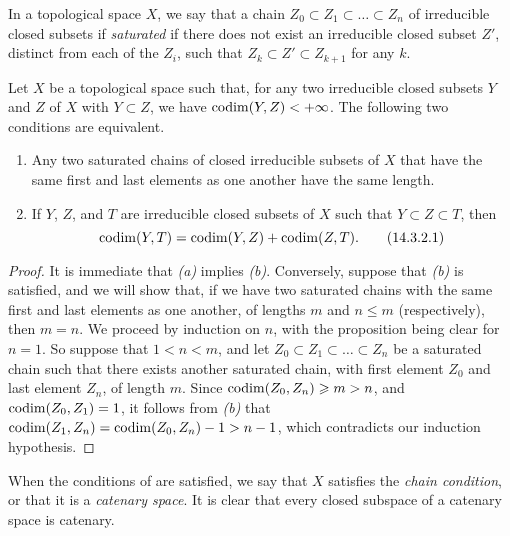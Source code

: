 \begin{env}[14.3.1]
\label{0.14.3.1}
In a topological space $X$, we say that a chain $Z_0\subset Z_1\subset\ldots\subset Z_n$ of irreducible closed subsets if \emph{saturated} if there does not exist an irreducible closed subset $Z'$, distinct from each of the $Z_i$, such that $Z_k\subset Z'\subset Z_{k+1}$ for any $k$.
\end{env}

\begin{prop}[14.3.2]
\label{0.14.3.2}
Let $X$ be a topological space such that, for any two irreducible closed subsets $Y$ and $Z$ of $X$ with $Y\subset Z$, we have ${\mathop{\mathrm{codim}}\nolimits}(Y,Z)<+\infty$.
The following two conditions are equivalent.
\begin{enumerate}[label=\emph{(\alph*)}]
    \item Any two saturated chains of closed irreducible subsets of $X$ that have the same first and last elements as one another have the same length.
    \item If $Y$, $Z$, and $T$ are irreducible closed subsets of $X$ such that $Y\subset Z\subset T$, then
        \begin{equation*}
        \label{0.14.3.2.1}
            {\mathop{\mathrm{codim}}\nolimits}(Y,T) = {\mathop{\mathrm{codim}}\nolimits}(Y,Z)+{\mathop{\mathrm{codim}}\nolimits}(Z,T).\tag{14.3.2.1}
        \end{equation*}
\end{enumerate}
\end{prop}

\begin{proof}
\label{proof-0.14.3.2}
It is immediate that \emph{(a)} implies \emph{(b)}.
Conversely, suppose that \emph{(b)} is satisfied, and we will show that, if we have two saturated chains with the same first and last elements as one another, of lengths $m$ and $n\leq m$ (respectively), then $m=n$.
We proceed by induction on $n$, with the proposition being clear for $n=1$.
So suppose that $1<n<m$, and let $Z_0\subset Z_1\subset\ldots\subset Z_n$ be a
saturated chain such that there exists another saturated chain, with first element $Z_0$ and last element $Z_n$, of length $m$.
Since ${\mathop{\mathrm{codim}}\nolimits}(Z_0,Z_n)\geqslant m>n$, and ${\mathop{\mathrm{codim}}\nolimits}(Z_0,Z_1)=1$, it follows from \emph{(b)} that ${\mathop{\mathrm{codim}}\nolimits}(Z_1,Z_n)={\mathop{\mathrm{codim}}\nolimits}(Z_0,Z_n)-1>n-1$, which contradicts our induction hypothesis.
\end{proof}

When the conditions of  are satisfied, we say that $X$ satisfies the \emph{chain condition}, or that it is a \emph{catenary space}.
It is clear that every closed subspace of a catenary space is catenary.


